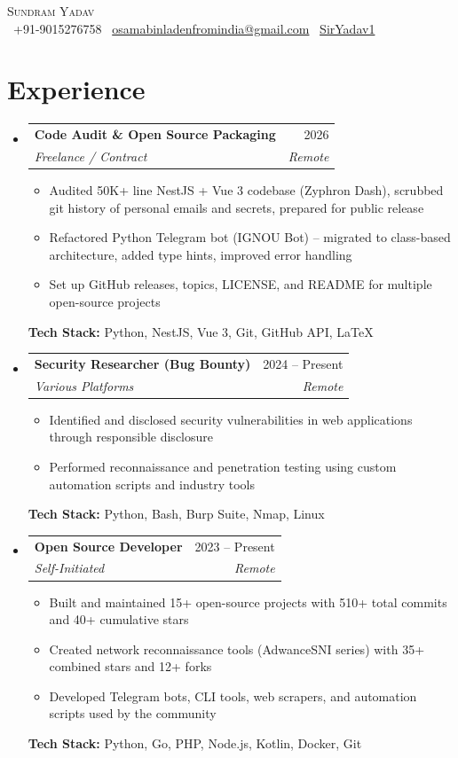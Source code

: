 \documentclass[letterpaper,11pt]{article}
\makeatletter
\newcommand{\resumeItem}[1]{
  \item\small{{#1 \vspace{-2pt}}}
}
\newcommand{\resumeSubheading}[4]{
  \vspace{-2pt}\item
    \begin{tabular*}{0.97\textwidth}[t]{l@{\extracolsep{\fill}}r}
      \textbf{#1} & #2 \\
      \textit{\small#3} & \textit{\small #4} \\
    \end{tabular*}\vspace{-7pt}
}
\newcommand{\resumeSubHeadingListStart}{\begin{itemize}[leftmargin=0.15in, label={}]}
\newcommand{\resumeSubHeadingListEnd}{\end{itemize}}
\newcommand{\resumeItemListStart}{\begin{itemize}}
\newcommand{\resumeItemListEnd}{\end{itemize}\vspace{-5pt}}
\makeatother
\begin{document}
\begin{center}
  {\Huge \scshape Sundram Yadav} \\[0.3em]
  \small
  \faPhone\ +91-9015276758 \quad
  \faEnvelope\ \href{mailto:osamabinladenfromindia@gmail.com}{osamabinladenfromindia@gmail.com} \quad
  \faGithub\ \href{https://github.com/SirYadav1}{SirYadav1}
\end{center}

\section{Experience}
\resumeSubHeadingListStart

  \resumeSubheading
    {Code Audit \& Open Source Packaging}{2026}
    {Freelance / Contract}{Remote}
    \resumeItemListStart
      \resumeItem{Audited 50K+ line NestJS + Vue 3 codebase (Zyphron Dash), scrubbed git history of personal emails and secrets, prepared for public release}
      \resumeItem{Refactored Python Telegram bot (IGNOU Bot) -- migrated to class-based architecture, added type hints, improved error handling}
      \resumeItem{Set up GitHub releases, topics, LICENSE, and README for multiple open-source projects}
    \resumeItemListEnd
    \small\textbf{Tech Stack:} Python, NestJS, Vue 3, Git, GitHub API, LaTeX

  \resumeSubheading
    {Security Researcher (Bug Bounty)}{2024 -- Present}
    {Various Platforms}{Remote}
    \resumeItemListStart
      \resumeItem{Identified and disclosed security vulnerabilities in web applications through responsible disclosure}
      \resumeItem{Performed reconnaissance and penetration testing using custom automation scripts and industry tools}
    \resumeItemListEnd
    \small\textbf{Tech Stack:} Python, Bash, Burp Suite, Nmap, Linux

  \resumeSubheading
    {Open Source Developer}{2023 -- Present}
    {Self-Initiated}{Remote}
    \resumeItemListStart
      \resumeItem{Built and maintained 15+ open-source projects with 510+ total commits and 40+ cumulative stars}
      \resumeItem{Created network reconnaissance tools (AdwanceSNI series) with 35+ combined stars and 12+ forks}
      \resumeItem{Developed Telegram bots, CLI tools, web scrapers, and automation scripts used by the community}
    \resumeItemListEnd
    \small\textbf{Tech Stack:} Python, Go, PHP, Node.js, Kotlin, Docker, Git

\resumeSubHeadingListEnd
\end{document}
